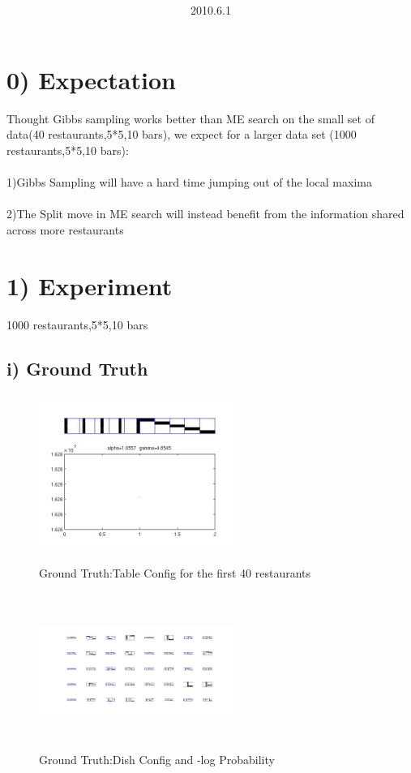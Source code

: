 \documentclass{article}
\title{\vspace{0.3in}\textmd{\textbf{\hmwkTitle}}}
\date{2010.6.1}
\author{\textbf{\hmwkAuthorName}}
\begin{document}
\begin{spacing}{1.1}
\maketitle

\section{0) Expectation}
Thought Gibbs sampling works better than ME search on the small set of data(40 restaurants,5*5,10 bars), we expect for a larger data set
(1000 restaurants,5*5,10 bars):\\ \\
1)Gibbs Sampling will have a hard time jumping out of the local maxima\\ \\
2)The Split move in ME search will instead benefit from the information shared across more restaurants\\

\section{1) Experiment}
1000 restaurants,5*5,10 bars\\

\subsection{i) Ground Truth}
\begin{figure}[h] 
  \begin{minipage}[b]{0.5\textwidth} 
    \centering 
    \includegraphics[width=2.5in,height=2in]{gt.jpg} 
    \caption{Ground Truth:Table Config for the first 40 restaurants}
    \label{fig:by:table} 
  \end{minipage}%
  \begin{minipage}[b]{0.5\textwidth} 
    \centering 
    \includegraphics[width=2.5in,height=2in]{g_td.jpg} 
    \caption{Ground Truth:Dish Config and -log Probability}
    \label{fig:by:table}  
   \end{minipage}%
\end{figure}


\end{spacing}
\end{document}
